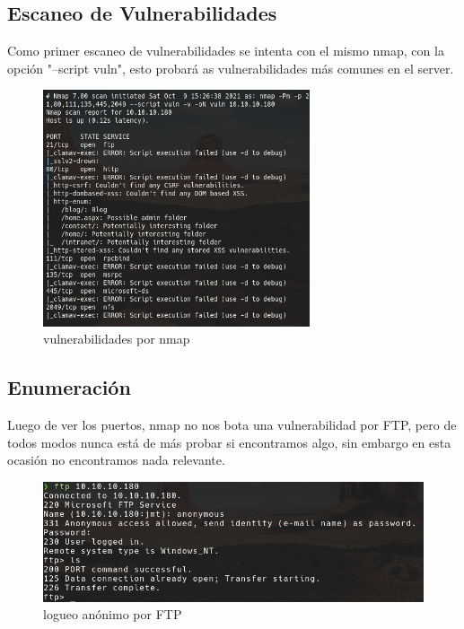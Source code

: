 \documentclass{article}
\begin{document}
\subsection{Escaneo de Vulnerabilidades}

Como primer escaneo de vulnerabilidades se intenta con el mismo nmap, con la opción "--script vuln", esto probará as vulnerabilidades más comunes en el server.

\begin{figure}[h]
	\center
	\includegraphics[width=0.7\textwidth]{images/remote/nmap_vuln.png}
	\caption{vulnerabilidades por nmap}
\end{figure}
\subsection{Enumeración}

Luego de ver los puertos, nmap no nos bota una vulnerabilidad por FTP, pero de todos modos nunca está de más probar si encontramos algo, sin embargo en esta ocasión no encontramos nada relevante.
\begin{figure}[h!]
	\center 
	\includegraphics[width=\textwidth]{images/remote/ftp.png}
	\caption{logueo anónimo por FTP}
\end{figure}
\end{document}
